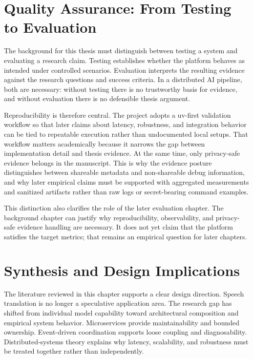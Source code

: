 \section{Quality Assurance: From Testing to Evaluation}
\label{sec:quality_assurance}

The background for this thesis must distinguish between testing a system and evaluating a research claim. Testing establishes whether the platform behaves as intended under controlled scenarios. Evaluation interprets the resulting evidence against the research questions and success criteria. In a distributed AI pipeline, both are necessary: without testing there is no trustworthy basis for evidence, and without evaluation there is no defensible thesis argument.

Reproducibility is therefore central. The project adopts a uv-first validation workflow so that later claims about latency, robustness, and integration behavior can be tied to repeatable execution rather than undocumented local setups. That workflow matters academically because it narrows the gap between implementation detail and thesis evidence. At the same time, only privacy-safe evidence belongs in the manuscript. This is why the evidence posture distinguishes between shareable metadata and non-shareable debug information, and why later empirical claims must be supported with aggregated measurements and sanitized artifacts rather than raw logs or secret-bearing command examples.

This distinction also clarifies the role of the later evaluation chapter. The background chapter can justify why reproducibility, observability, and privacy-safe evidence handling are necessary. It does not yet claim that the platform satisfies the target metrics; that remains an empirical question for later chapters.

\section{Synthesis and Design Implications}
\label{sec:synthesis_design_implications}

The literature reviewed in this chapter supports a clear design direction. Speech translation is no longer a speculative application area. The research gap has shifted from individual model capability toward architectural composition and empirical system behavior. Microservices provide maintainability and bounded ownership. Event-driven coordination supports loose coupling and diagnosability. Distributed-systems theory explains why latency, scalability, and robustness must be treated together rather than independently.

